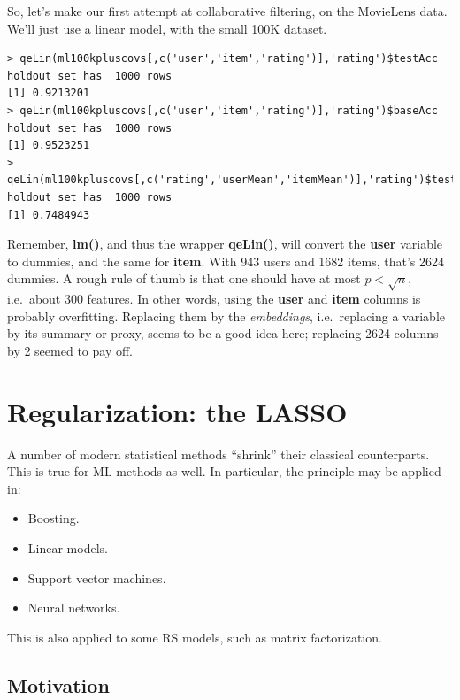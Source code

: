 So, let's make our first attempt at collaborative filtering, on the
MovieLens data.  We'll just use a linear model, with the small 100K
dataset.

\begin{lstlisting}
> qeLin(ml100kpluscovs[,c('user','item','rating')],'rating')$testAcc
holdout set has  1000 rows
[1] 0.9213201
> qeLin(ml100kpluscovs[,c('user','item','rating')],'rating')$baseAcc
holdout set has  1000 rows
[1] 0.9523251
> qeLin(ml100kpluscovs[,c('rating','userMean','itemMean')],'rating')$testAcc
holdout set has  1000 rows
[1] 0.7484943
\end{lstlisting}

Remember, \textbf{lm()}, and thus the wrapper \textbf{qeLin()}, will
convert the \textbf{user} variable to dummies, and the same for
\textbf{item}.  With 943 users and 1682 items, that's 2624 dummies.
A rough rule of thumb is that one should have at most $p < \sqrt{n}$, i.e.\
about 300 features.  In other words, using the \textbf{user} and
\textbf{item} columns is probably overfitting.  Replacing them by the
\textit{embeddings}, i.e.\ replacing a variable by its summary or proxy,
seems to be a good idea here; replacing 2624 columns by 2 seemed to pay
off.

\section{Regularization: the LASSO}

A number of modern statistical methods ``shrink'' their classical
counterparts.  This is true for ML methods as well.  In particular, the
principle may be applied in:

\begin{itemize}

\item Boosting.

\item Linear models.

\item Support vector machines.

\item Neural networks.

\end{itemize}

This is also applied to some RS models, such as matrix factorization.

\subsection{Motivation}

